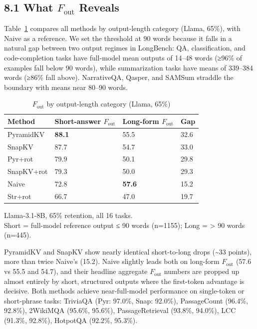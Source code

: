 \documentclass[10pt,letterpaper]{article}
\begin{document}
\hypertarget{what-f_textout-reveals}{%
\subsection{\texorpdfstring{8.1 What \(F_{\text{out}}\)
Reveals}{8.1 What F\_\{\textbackslash text\{out\}\} Reveals}}\label{what-f_textout-reveals}}

Table~\ref{tab:t5} compares all methods by output-length category (Llama, 65\%),
with Naive as a reference. We set the threshold at 90 words because it
falls in a natural gap between two output regimes in LongBench: QA,
classification, and code-completion tasks have full-model mean outputs
of 14--48 words (≥96\% of examples fall below 90 words), while
summarization tasks have means of 339--384 words (≥86\% fall above).
NarrativeQA, Qasper, and SAMSum straddle the boundary with means near
80--90 words.
\begin{table}[H]
\centering
\small
\caption{\(F_{\text{out}}\) by output-length category (Llama, 65\%)}
\label{tab:t5}
\begin{tabular}{@{}llll@{}}
\toprule
Method & Short-answer \(F_{\text{out}}\) & Long-form \(F_{\text{out}}\)
& Gap\\
\midrule
PyramidKV & \textbf{88.1} & 55.5 & 32.6\\
SnapKV & 87.7 & 54.7 & 33.0\\
Pyr+rot & 79.9 & 50.1 & 29.8\\
SnapKV+rot & 79.3 & 50.0 & 29.3\\
Naive & 72.8 & \textbf{57.6} & 15.2\\
Str+rot & 66.7 & 47.0 & 19.7\\
\bottomrule
\end{tabular}

\center Llama-3.1-8B, 65\% retention, all 16 tasks.
\\Short = full-model reference output ≤ 90 words (n=1155); Long =
\textgreater{} 90 words (n=445).
\end{table}

PyramidKV and SnapKV show nearly identical short-to-long drops
(\textasciitilde33 points), more than twice Naive's (15.2). Naive
slightly leads both on long-form \(F_{\text{out}}\) (57.6 vs 55.5 and
54.7), and their headline aggregate \(F_{\text{out}}\) numbers are
propped up almost entirely by short, structured outputs where the
first-token advantage is decisive. Both methods achieve near-full-model
performance on single-token or short-phrase tasks: TriviaQA (Pyr:
97.0\%, Snap: 92.0\%), PassageCount (96.4\%, 92.8\%), 2WikiMQA (95.6\%,
95.6\%), PassageRetrieval (93.8\%, 94.0\%), LCC (91.3\%, 92.8\%),
HotpotQA (92.2\%, 95.3\%).
\end{document}
